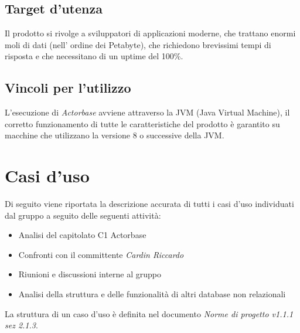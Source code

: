 \documentclass[a4paper]{article}
\begin{document}
	\subsection{Target d'utenza}
		Il prodotto si rivolge a sviluppatori di applicazioni moderne, che trattano enormi moli di dati (nell'
		ordine dei Petabyte), che richiedono brevissimi tempi di risposta e che necessitano di un uptime 
		del 100\%.
	\subsection{Vincoli per l'utilizzo}
		L'esecuzione di \emph{Actorbase} avviene attraverso la JVM (Java Virtual Machine), il corretto funzionamento di tutte le caratteristiche del prodotto è garantito su macchine che utilizzano la versione 8 o successive della JVM. 
	
	\newpage \section{Casi d'uso}
		Di seguito viene riportata la descrizione accurata di tutti i casi d'uso individuati dal gruppo a seguito
		delle seguenti attività:
		\begin{itemize}
			\item Analisi del capitolato C1 Actorbase
			\item Confronti con il committente \emph{Cardin Riccardo}
			\item Riunioni e discussioni interne al gruppo
			\item Analisi della struttura e delle funzionalità di altri database non relazionali
		\end{itemize}
		La struttura di un caso d'uso è definita nel documento \emph{Norme di progetto v1.1.1 sez 2.1.3}.
\end{document}
